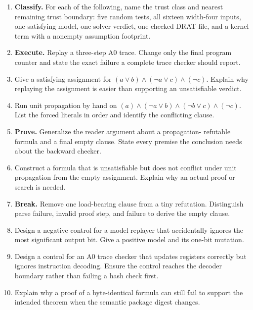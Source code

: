 \begin{enumerate}
\item \textbf{Classify.} For each of the following, name the trust class and
nearest remaining trust boundary: five random tests, all sixteen width-four
inputs, one satisfying model, one solver verdict, one checked DRAT file, and a
kernel term with a nonempty assumption footprint.

\item \textbf{Execute.} Replay a three-step A0 trace. Change only the final
program counter and state the exact failure a complete trace checker should
report.

\item Give a satisfying assignment for
\((a\lor b)\land(\neg a\lor c)\land(\neg c)\). Explain why replaying the
assignment is easier than supporting an unsatisfiable verdict.

\item Run unit propagation by hand on
\((a)\land(\neg a\lor b)\land(\neg b\lor c)\land(\neg c)\). List the forced
literals in order and identify the conflicting clause.

\item \textbf{Prove.} Generalize the reader argument about a propagation-
refutable formula and a final empty clause. State every premise the conclusion
needs about the backward checker.

\item Construct a formula that is unsatisfiable but does not conflict under
unit propagation from the empty assignment. Explain why an actual proof or
search is needed.

\item \textbf{Break.} Remove one load-bearing clause from a tiny refutation.
Distinguish parse failure, invalid proof step, and failure to derive the empty
clause.

\item Design a negative control for a model replayer that accidentally ignores
the most significant output bit. Give a positive model and its one-bit
mutation.

\item Design a control for an A0 trace checker that updates registers correctly
but ignores instruction decoding. Ensure the control reaches the decoder
boundary rather than failing a hash check first.

\item Explain why a proof of a byte-identical formula can still fail to support
the intended theorem when the semantic package digest changes.


\end{enumerate}
